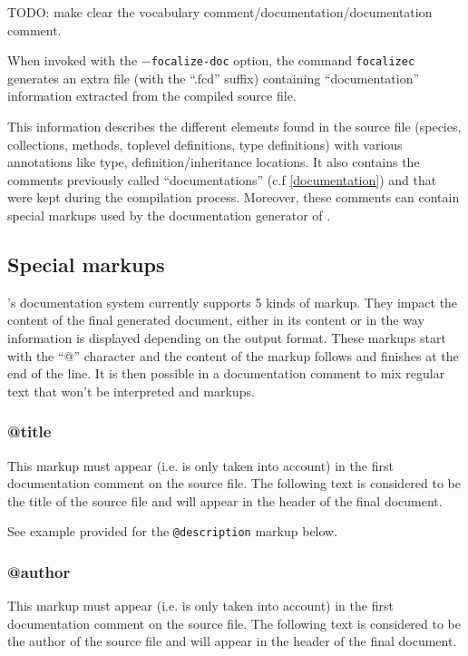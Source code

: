 {\color{red} TODO: make clear the vocabulary
  comment/documentation/documentation comment}.

When invoked with the {\tt $-$focalize-doc} option, the command
{\tt focalizec} generates an extra file (with the ``.fcd'' suffix)
containing ``documentation'' information extracted from the compiled
source file.

This information describes the different elements found in the source
file (species, collections, methods, toplevel definitions, type
definitions) with various annotations like type,
definition/inheritance locations. It also contains the comments
previously called ``documentations'' (c.f \ref{documentation}) and that
were kept during the compilation process. Moreover, these comments can
contain special markups used by the documentation generator of \focal.



\subsection{Special markups}
\focal's documentation system currently supports 5 kinds of
markup. They impact the content of the final generated document,
either in its content or in the way information is displayed depending
on the output format. These markups start with the ``@'' character and
the content of the markup follows and finishes at the end of the
line. It is then possible in a documentation comment to mix regular
text that won't be interpreted and markups.

\subsubsection{@title}
This markup must appear (i.e. is only taken into account) in the first
documentation comment on the source file. The following text is
considered to be the title of the source file and will appear in the
header of the final document.

See example provided for the {\tt @description} markup below.



\subsubsection{@author}
This markup must appear (i.e. is only taken into account) in the first
documentation comment on the source file. The following text is
considered to be the author of the source file and will appear in the
header of the final document.

